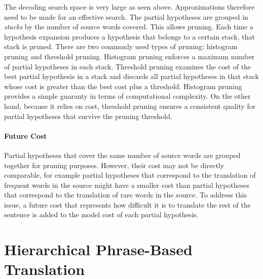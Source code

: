 The decoding search space is very large
as seen above. Approximations
therefore need to be made for an effective search.
The partial hypotheses are grouped in \emph{stacks}
by the number of source words covered.
This allows pruning. Each time a hypothesis expansion produces a hypothesis that
belongs to a certain stack, that stack is pruned.
There are two commonly used types of pruning: histogram pruning and threshold
pruning. Histogram pruning enforces a maximum number
of partial hypotheses in each stack. Threshold pruning
examines the cost of the best partial hypothesis in a stack
and discards all partial hypotheses in that stack whose cost
is greater than the best cost plus a threshold.
Histogram pruning provides a simple guaranty in terms
of computational complexity. On the other hand, because it relies
on cost, threshold pruning ensures a consistent quality for partial
hypotheses that survive the pruning threshold.

\paragraph{Future Cost}
\label{sec:phraseBasedFutureCost}

Partial hypotheses that cover the same number of source
words are grouped together for pruning purposes. However,
their cost may not be directly comparable, for example
partial hypotheses that correspond to the translation of frequent
words in the source might have a smaller cost than partial hypotheses
that correspond to the translation of rare words in the source.
To address this issue, a future cost that represents how difficult it is
to translate the rest of the sentence is added to the model cost of each
partial hypothesis.

\section{Hierarchical Phrase-Based Translation}
\label{sec:hierarchicalPhraseBasedTranslation}


